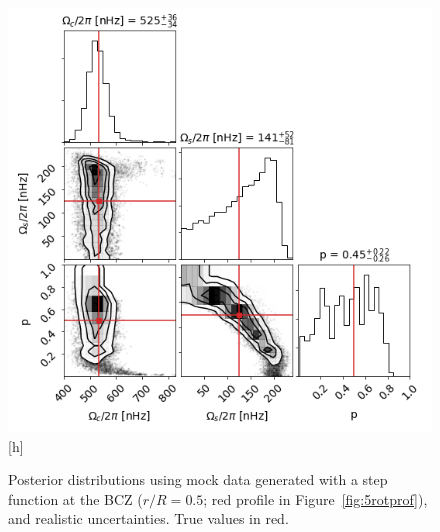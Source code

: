 \begin{figure}
\centering
    \includegraphics[width=\textwidth]{Figures/subgiant_chapter_figures/10.5_corner.png}[h]
    \caption{Posterior distributions using mock data generated with a step function at the BCZ ($r/R = 0.5$; red profile in Figure~\ref{fig:5rotprof}), and realistic uncertainties. True values in red.}
    \label{fig:mock_posterior_050_uniform}
\end{figure}

